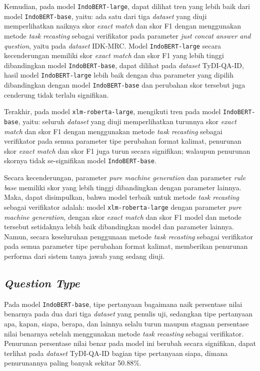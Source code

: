 Kemudian, pada model \texttt{IndoBERT-large}, dapat dilihat tren yang lebih baik dari model \texttt{IndoBERT-base}, yaitu: ada satu dari tiga \emph{dataset} yang diuji memperlihatkan naiknya skor \emph{exact match} dan skor F1 dengan menggunakan metode \emph{task recasting} sebagai verifikator pada parameter \emph{just concat answer and question}, yaitu pada \emph{dataset} IDK-MRC. Model \texttt{IndoBERT-large} secara kecenderungan memiliki skor \emph{exact match} dan skor F1 yang lebih tinggi dibandingkan model \texttt{IndoBERT-base}, dapat dilihat pada \emph{dataset} TyDI-QA-ID, hasil model \texttt{IndoBERT-large} lebih baik dengan dua parameter yang dipilih dibandingkan dengan model \texttt{IndoBERT-base} dan perubahan skor tersebut juga cenderung tidak terlalu signifikan.

Terakhir, pada model \texttt{xlm-roberta-large}, mengikuti tren pada model \texttt{IndoBERT-base}, yaitu: seluruh \emph{dataset} yang diuji memperlihatkan turunnya skor \emph{exact match} dan skor F1 dengan menggunakan metode \emph{task recasting} sebagai verifikator pada semua parameter tipe perubahan format kalimat, penurunan skor \emph{exact match} dan skor F1 juga turun secara signifikan; walaupun penurunan skornya tidak se-signifikan model \texttt{IndoBERT-base}.

Secara kecenderungan, parameter \emph{pure machine generation} dan parameter \emph{rule base} memiliki skor yang lebih tinggi dibandingkan dengan parameter lainnya. Maka, dapat disimpulkan, bahwa model terbaik untuk metode \emph{task recasting} sebagai verifikator adalah: model \texttt{xlm-roberta-large} dengan parameter \emph{pure machine generation}, dengan skor \emph{exact match} dan skor F1 model dan metode tersebut setidaknya lebih baik dibandingkan model dan parameter lainnya. Namun, secara keseluruhan penggunaan metode \emph{task recasting} sebagai verifikator pada semua parameter tipe perubahan format kalimat, memberikan penurunan performa dari sistem tanya jawab yang sedang diuji.

\subsection{\emph{Question Type}}
Pada model \texttt{IndoBERT-base}, tipe pertanyaan bagaimana naik persentase nilai benarnya pada dua dari tiga \emph{dataset} yang penulis uji, sedangkan tipe pertanyaan apa, kapan, siapa, berapa, dan lainnya selalu turun maupun stagnan persentase nilai benarnya setelah menggunakan metode \emph{task recasting} sebagai verifikator. Penurunan persentase nilai benar pada model ini berubah secara signifikan, dapat terlihat pada \emph{dataset} TyDI-QA-ID bagian tipe pertanyaan siapa, dimana penurunannya paling banyak sekitar 50.88\%.

